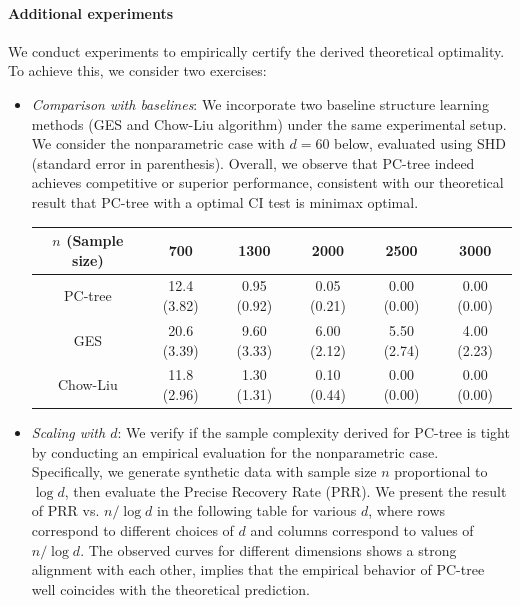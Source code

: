 \documentclass{article}
\theoremstyle{definition}
\theoremstyle{definition}
\theoremstyle{definition}
\theoremstyle{definition}
\theoremstyle{definition}
\theoremstyle{definition}
\theoremstyle{remark}
\theoremstyle{remark}
\begin{document}
\paragraph{Additional experiments}
We conduct experiments to empirically certify the derived theoretical optimality. To achieve this, we consider two exercises:
\begin{itemize}
    \item \emph{Comparison with baselines}: We incorporate two baseline structure learning methods (GES and Chow-Liu algorithm) under the same experimental setup. We consider the nonparametric case with $d=60$ below, evaluated using SHD (standard error in parenthesis). Overall, we observe that PC-tree indeed achieves competitive or superior performance, consistent with our theoretical result that PC-tree with a optimal CI test is minimax optimal. 

    \begin{table}[h]
    \centering
    \begin{tabular}{c|ccccc}
    \hline
    $n$ (Sample size) & 700 & 1300 & 2000 & 2500 & 3000 \\
    \hline
    PC-tree   & 12.4 (3.82) & 0.95 (0.92) & 0.05 (0.21) & 0.00 (0.00) & 0.00 (0.00) \\
    GES       & 20.6 (3.39) & 9.60 (3.33) & 6.00 (2.12) & 5.50 (2.74) & 4.00 (2.23) \\
    Chow-Liu  & 11.8 (2.96) & 1.30 (1.31) & 0.10 (0.44) & 0.00 (0.00) & 0.00 (0.00) \\
    \hline
    \end{tabular}
    \end{table}
    
    \item \emph{Scaling with $d$}: We verify if the sample complexity derived for PC-tree is tight by conducting an empirical evaluation for the nonparametric case.
    Specifically, we generate synthetic data with sample size $n$ proportional to $\log d$, then evaluate the Precise Recovery Rate (PRR). We present the result of PRR vs. $n / \log d$ in the following table for various $d$, where rows correspond to different choices of $d$ and columns correspond to values of $n/\log d$. The observed curves for different dimensions shows a strong alignment with each other, implies that the empirical behavior of PC-tree well coincides with the theoretical prediction.


\end{itemize}
\end{document}
